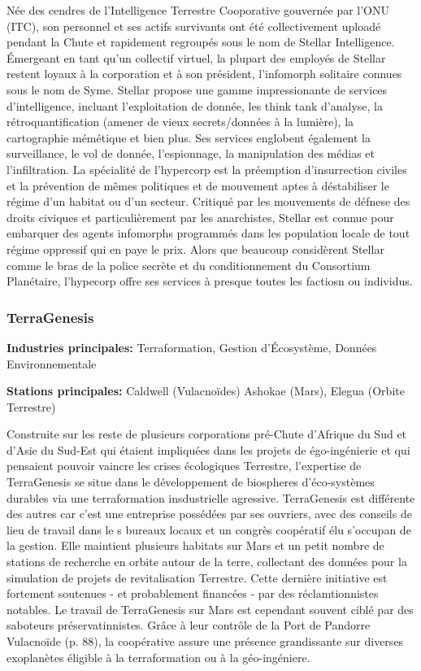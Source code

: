                            Née des cendres de l'Intelligence Terrestre Cooporative gouvernée par l'ONU (ITC), son personnel et ses actifs survivants ont été collectivement uploadé pendant la Chute et rapidement regroupés sous le nom de Stellar Intelligence. Émergeant en tant qu'un collectif virtuel, la plupart des employés de Stellar restent loyaux à la corporation et à son président, l'infomorph solitaire connues sous le nom de Syme. Stellar propose une gamme impressionante de services d'intelligence, incluant l'exploitation de donnée, les think tank d'analyse, la rétroquantification (amener de vieux secrets/données à la lumière), la cartographie mémétique et bien plus. Ses services englobent également la surveillance, le vol de donnée, l'espionnage, la manipulation des médias et l'infiltration. La spécialité de l'hypercorp est la préemption d'insurrection civiles et la prévention de mêmes politiques et de mouvement aptes à déstabiliser le régime d'un habitat ou d'un secteur. Critiqué par les mouvements de défnese des droits civiques et particulièrement par les anarchistes, Stellar est connue pour embarquer des agents infomorphs programmés dans les population locale de tout régime oppressif qui en paye le prix. Alors que beaucoup considèrent Stellar comme le bras de la police secrète et du conditionnement du Consortium Planétaire, l'hypecorp offre ses services à presque toutes les factiosn ou individus. 

                           \subsubsection{TerraGenesis} \label{sec:terragenesis} 

                           \textbf{Industries principales:} Terraformation, Gestion d'Écosystème, Données Environnementale 

                           \textbf{Stations principales:} Caldwell (Vulacnoïdes) Ashokae (Mars), Elegua (Orbite Terrestre) 

                           Construite sur les reste de plusieurs corporations pré-Chute d'Afrique du Sud et d'Asie du Sud-Est qui étaient impliquées dans les projets de égo-ingénierie et qui pensaient pouvoir vaincre les crises écologiques Terrestre, l'expertise de TerraGenesis se situe dans le développement de biospheres d'éco-systèmes durables via une terraformation insdustrielle agressive. TerraGenesis est différente des autres car c'est une entreprise possédées par ses ouvriers, avec des conseils de lieu de travail dans le s bureaux locaux et un congrès coopératif élu s'occupan de la gestion. Elle maintient plusieurs habitats sur Mars et un petit nombre de stations de recherche en orbite autour de la terre, collectant des données pour la simulation de projets de revitalisation Terrestre. Cette dernière initiative est fortement soutenues - et probablement financées - par des réclamtionnistes notables. Le travail de TerraGenesis sur Mars est cependant souvent ciblé par des saboteurs préservatinnistes. Grâce à leur contrôle de la Port de Pandorre Vulacnoïde (p. 88), la coopérative assure une présence grandissante sur diverses exoplanètes éligible à la terraformation ou à la géo-ingéniere. 

